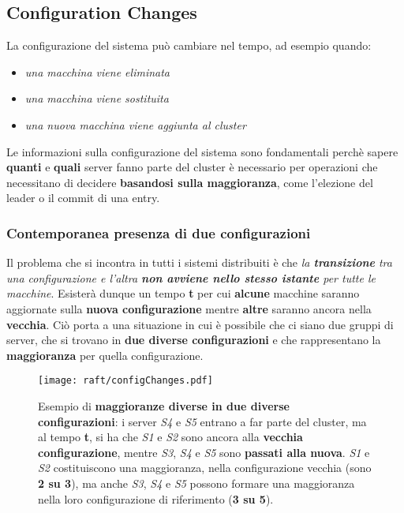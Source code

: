 \subsection{Configuration Changes}
La configurazione del sistema può cambiare nel tempo, ad esempio quando:
  \begin{itemize}
    \item{\emph{una macchina viene eliminata}}
    \item{\emph{una macchina viene sostituita}}
    \item{\emph{una nuova macchina viene aggiunta al cluster}}
  \end{itemize}

Le informazioni sulla configurazione del sistema sono fondamentali perchè sapere \textbf{quanti} e \textbf{quali} server fanno parte del cluster è necessario per operazioni che necessitano di decidere \textbf{basandosi sulla maggioranza}, come l'elezione del leader o il commit di una entry.

\subsubsection{Contemporanea presenza di due configurazioni}
  Il problema che si incontra in tutti i sistemi distribuiti è che \textit{la \textbf{transizione} tra una configurazione e l'altra \textbf{non avviene nello stesso istante} per tutte le macchine}. Esisterà dunque un tempo \textbf{t} per cui \textbf{alcune} macchine saranno aggiornate sulla \textbf{nuova configurazione} mentre \textbf{altre} saranno ancora nella \textbf{vecchia}. Ciò porta a una situazione in cui è possibile che ci siano due gruppi di server, che si trovano in \textbf{due diverse configurazioni} e che rappresentano la \textbf{maggioranza} per quella configurazione.

  \begin{figure}[H]
    \centering
    \texttt{[image: raft/configChanges.pdf]}
    \caption{Esempio di \textbf{maggioranze diverse in due diverse configurazioni}: i server \textit{S4} e \textit{S5} entrano a far parte del cluster, ma al tempo \textbf{t}, si ha che \textit{S1} e \textit{S2} sono ancora alla \textbf{vecchia configurazione}, mentre \textit{S3}, \textit{S4} e \textit{S5} sono \textbf{passati alla nuova}.
    \textit{S1} e \textit{S2} costituiscono una maggioranza, nella configurazione vecchia (sono \textbf{2 su 3}), ma anche \textit{S3}, \textit{S4} e \textit{S5} possono formare una maggioranza nella loro configurazione di riferimento (\textbf{3 su 5}). }
    \label{fig:figure 8}
  \end{figure}

